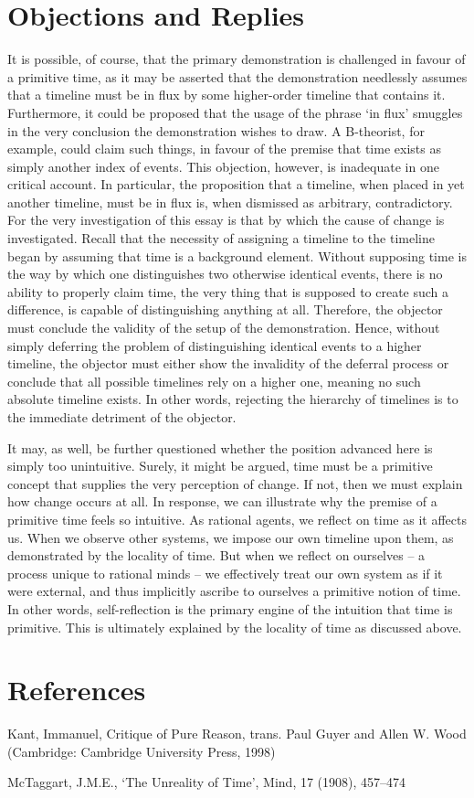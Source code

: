 \documentclass{article}
\begin{document}
\section{Objections and Replies}
It is possible, of course, that the primary demonstration is challenged in favour of a primitive time, as it may be asserted that the demonstration needlessly assumes that a timeline must be in flux by some higher-order timeline that contains it. Furthermore, it could be proposed that the usage of the phrase ‘in flux’ smuggles in the very conclusion the demonstration wishes to draw. A B-theorist, for example, could claim such things, in favour of the premise that time exists as simply another index of events. This objection, however, is inadequate in one critical account. In particular, the proposition that a timeline, when placed in yet another timeline, must be in flux is, when dismissed as arbitrary, contradictory. For the very investigation of this essay is that by which the cause of change is investigated. Recall that the necessity of assigning a timeline to the timeline began by assuming that time is a background element. Without supposing time is the way by which one distinguishes two otherwise identical events, there is no ability to properly claim time, the very thing that is supposed to create such a difference, is capable of distinguishing anything at all. Therefore, the objector must conclude the validity of the setup of the demonstration. Hence, without simply deferring the problem of distinguishing identical events to a higher timeline, the objector must either show the invalidity of the deferral process or conclude that all possible timelines rely on a higher one, meaning no such absolute timeline exists. In other words, rejecting the hierarchy of timelines is to the immediate detriment of the objector.
	
It may, as well, be further questioned whether the position advanced here is simply too unintuitive. Surely, it might be argued, time must be a primitive concept that supplies the very perception of change. If not, then we must explain how change occurs at all. In response, we can illustrate why the premise of a primitive time feels so intuitive. As rational agents, we reflect on time as it affects us. When we observe other systems, we impose our own timeline upon them, as demonstrated by the locality of time. But when we reflect on ourselves – a process unique to rational minds – we effectively treat our own system as if it were external, and thus implicitly ascribe to ourselves a primitive notion of time. In other words, self-reflection is the primary engine of the intuition that time is primitive. This is ultimately explained by the locality of time as discussed above.

\section{References}
Kant, Immanuel, Critique of Pure Reason, trans. Paul Guyer and Allen W. Wood (Cambridge: Cambridge University Press, 1998)

McTaggart, J.M.E., ‘The Unreality of Time’, Mind, 17 (1908), 457–474
\end{document}
